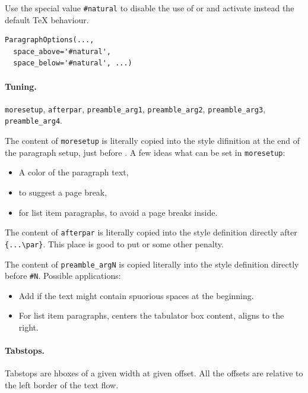 \documentclass[]{ltugboat}
\begin{document}
Use the special value \verb|#natural| to disable the use of  or  and activate instead the default \TeX{} behaviour.

\begin{verbatim}
ParagraphOptions(...,
  space_above='#natural',
  space_below='#natural', ...)
\end{verbatim}

\paragraph{Tuning.} \verb|moresetup|, \verb|afterpar|, \verb|preamble_arg1|, \verb|preamble_arg2|, \verb|preamble_arg3|, \verb|preamble_arg4|.

The content of \verb|moresetup| is literally copied into the style difinition at the end of the paragraph setup, just before . A few ideas what can be set in \verb|moresetup|:

\begin{itemize}
\item A color of the paragraph text,
\item {} to suggest a page break,
\item {} for list item paragraphs, to avoid a page breaks inside.
\end{itemize}

The content of \verb|afterpar| is literally copied into the style definition directly after \verb|{...\par}|. This place is good to put  or some other penalty.

The content of \verb|preamble_argN| is copied literally into the style definition directly before \verb|#N|. Possible applications:

\begin{itemize}
\item Add  if the text might contain spuorious spaces at the beginning.
\item For list item paragraphs,  centers the tabulator box content,  aligns to the right.
\end{itemize}

\paragraph{Tabstops.} Tabstops are hboxes of a given width at given offset. All the offsets are relative to the left border of the text flow.
\end{document}
